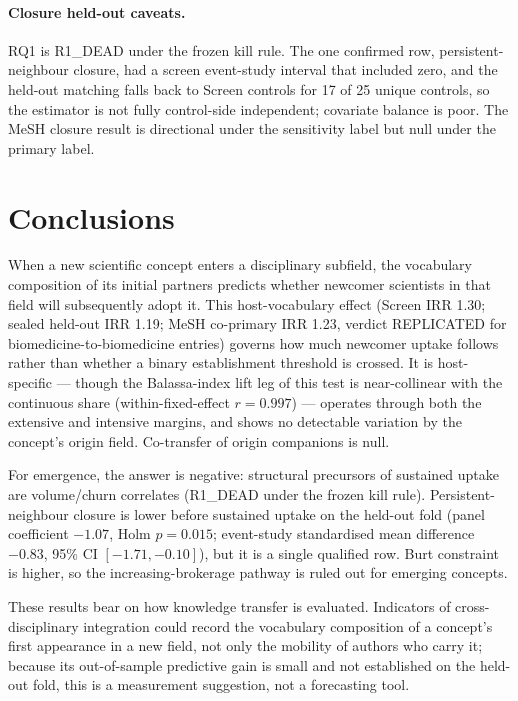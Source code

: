 \documentclass[11pt,letterpaper]{article}
\begin{document}
\paragraph{Closure held-out caveats.} RQ1 is R1\_DEAD under the frozen kill rule. The one confirmed row,
persistent-neighbour closure, had a screen event-study interval that included zero, and the held-out matching
falls back to Screen controls for 17 of 25 unique controls, so the estimator is not fully control-side
independent; covariate balance is poor. The MeSH closure result is
directional under the sensitivity label but null under the primary label.

\section{Conclusions}
\label{sec:conclusions}

When a new scientific concept enters a disciplinary subfield, the vocabulary composition of its initial
partners predicts whether newcomer scientists in that field will subsequently adopt it. This host-vocabulary
effect (Screen IRR 1.30; sealed held-out IRR 1.19; MeSH co-primary IRR 1.23, verdict REPLICATED for
biomedicine-to-biomedicine entries) governs how much newcomer uptake follows rather than whether a binary
establishment threshold is crossed. It is host-specific
--- though the Balassa-index lift leg of this test is near-collinear with the continuous share
(within-fixed-effect $r = 0.997$) --- operates through both the extensive and intensive margins, and shows no
detectable variation by the concept's origin field. Co-transfer of origin companions is null.

For emergence, the answer is negative: structural precursors of sustained uptake are volume/churn
correlates (R1\_DEAD under the frozen kill rule). Persistent-neighbour closure is lower before sustained uptake on
the held-out fold (panel coefficient $-1.07$, Holm $p = 0.015$; event-study standardised mean difference
$-0.83$, 95\% CI $[-1.71, -0.10]$), but it is a single qualified row. Burt constraint is higher, so the
increasing-brokerage pathway is ruled out for emerging concepts.

These results bear on how knowledge transfer is evaluated. Indicators of cross-disciplinary integration could
record the vocabulary composition of a concept's first appearance in a new field, not only the mobility of
authors who carry it; because its out-of-sample predictive gain is small and not established on the held-out fold,
this is a measurement suggestion, not a forecasting tool.
\end{document}
